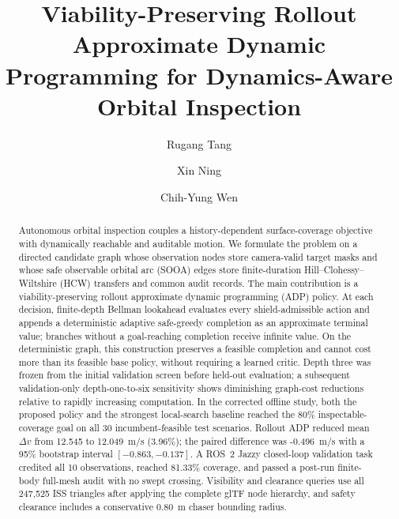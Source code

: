 \documentclass{IEEEtaes}
\newcommand{\unit}[2]{#1~#2}
\theoremstyle{remark}
\theoremstyle{plain}
\begin{document}
\title{Viability-Preserving Rollout Approximate Dynamic Programming for Dynamics-Aware Orbital Inspection}

\author{Rugang Tang}

\author{Xin Ning}

\author{Chih-Yung Wen}


\receiveddate{}




\maketitle

\begin{abstract}
Autonomous orbital inspection couples a history-dependent surface-coverage objective with dynamically reachable and auditable motion. We formulate the problem on a directed candidate graph whose observation nodes store camera-valid target masks and whose safe observable orbital arc (SOOA) edges store finite-duration Hill--Clohessy--Wiltshire (HCW) transfers and common audit records. The main contribution is a viability-preserving rollout approximate dynamic programming (ADP) policy. At each decision, finite-depth Bellman lookahead evaluates every shield-admissible action and appends a deterministic adaptive safe-greedy completion as an approximate terminal value; branches without a goal-reaching completion receive infinite value. On the deterministic graph, this construction preserves a feasible completion and cannot cost more than its feasible base policy, without requiring a learned critic. Depth three was frozen from the initial validation screen before held-out evaluation; a subsequent validation-only depth-one-to-six sensitivity shows diminishing graph-cost reductions relative to rapidly increasing computation. In the corrected offline study, both the proposed policy and the strongest local-search baseline reached the 80\% inspectable-coverage goal on all 30 incumbent-feasible test scenarios. Rollout ADP reduced mean $\Delta v$ from 12.545 to \unit{12.049}{m/s} (3.96\%); the paired difference was \unit{-0.496}{m/s} with a 95\% bootstrap interval $[-0.863,-0.137]$. A ROS~2 Jazzy closed-loop validation task credited all 10 observations, reached 81.33\% coverage, and passed a post-run finite-body full-mesh audit with no swept crossing. Visibility and clearance queries use all 247,525 ISS triangles after applying the complete glTF node hierarchy, and safety clearance includes a conservative \unit{0.80}{m} chaser bounding radius.
\end{abstract}
\end{document}
